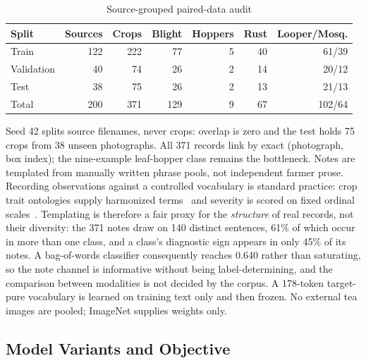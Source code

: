 \documentclass[conference]{IEEEtran}
\begin{document}
\begin{table}[t]
\caption{Source-grouped paired-data audit}
\label{tab:dataaudit}
\centering\footnotesize
\setlength\tabcolsep{4.0pt}
\begin{tabular}{lrrrrrr}
\toprule
\textbf{Split} & \textbf{Sources} & \textbf{Crops} & \textbf{Blight} &
\textbf{Hoppers} & \textbf{Rust} & \textbf{Looper/Mosq.}\\
\midrule
Train      & 122 & 222 & 77 & 5 & 40 & 61/39\\
Validation & 40  & 74  & 26 & 2 & 14 & 20/12\\
Test       & 38  & 75  & 26 & 2 & 13 & 21/13\\
\midrule
Total      & 200 & 371 & 129 & 9 & 67 & 102/64\\
\bottomrule
\end{tabular}
\end{table}

Seed 42 splits source filenames, never crops: overlap is zero and the test holds
75 crops from 38 unseen photographs. All 371 records link by exact (photograph,
box index); the nine-example leaf-hopper class remains the bottleneck. Notes are
templated from manually written phrase pools, not independent farmer prose.
Recording observations against a controlled vocabulary is standard practice:
crop trait ontologies supply harmonized
terms~\cite{Shrestha2010CropOntology,Andres2021FAIRVocab} and severity is scored
on fixed ordinal scales~\cite{Bock2021Severity,DelPonte2017SAD}. Templating is
therefore a fair proxy for the \emph{structure} of real records, not their
diversity: the 371 notes draw on 140 distinct sentences, 61\% of which occur in
more than one class, and a class's diagnostic sign appears in only 45\% of its
notes. A
bag-of-words classifier consequently reaches 0.640 rather than saturating, so
the note channel is informative without being label-determining, and the
comparison between modalities is not decided by the corpus. A
178-token target-pure vocabulary is learned on training text only and then
frozen. No external tea images are pooled; ImageNet supplies weights only.

\subsection{Model Variants and Objective}
\label{sec:variants}
\end{document}
